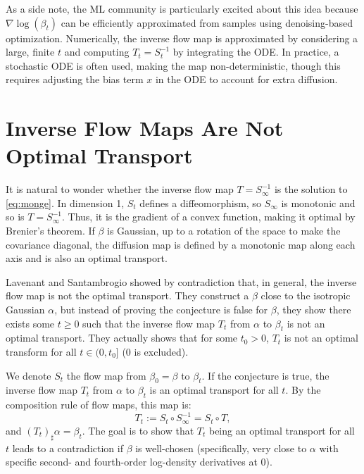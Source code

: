 \documentclass{article}
\begin{document}
As a side note, the ML community is particularly excited about this idea because $\nabla \log(\beta_t)$ can be efficiently approximated from samples using denoising-based optimization. Numerically, the inverse flow map is approximated by considering a large, finite $t$ and computing $T_t = S_t^{-1}$ by integrating the ODE. In practice, a stochastic ODE is often used, making the map non-deterministic, though this requires adjusting the bias term $x$ in the ODE to account for extra diffusion.

\section{Inverse Flow Maps Are Not Optimal Transport}

It is natural to wonder whether the inverse flow map $T=S_\infty^{-1}$ is the solution to \eqref{eq:monge}. In dimension 1, $S_t$ defines a diffeomorphism, so $S_\infty$ is monotonic and so is $T=S_\infty^{-1}$. Thus, it is the gradient of a convex function, making it optimal by Brenier's theorem. If $\beta$ is Gaussian, up to a rotation of the space to make the covariance diagonal, the diffusion map is defined by a monotonic map along each axis and is also an optimal transport.

Lavenant and Santambrogio showed  by contradiction that, in general, the inverse flow map is not the optimal transport. They construct a $\beta$ close to the isotropic Gaussian $\alpha$, but instead of proving the conjecture is false for $\beta$, they show there exists some $t \geq 0$ such that the inverse flow map $T_t$ from $\alpha$ to $\beta_t$ is not an optimal transport. They actually shows that for some $t_0>0$, $T_t$ is not an optimal transform for all $t \in (0,t_0]$ (0 is excluded). 

We denote $S_t$ the flow map from $\beta_0 = \beta$ to $\beta_t$. If the conjecture is true, the inverse flow map $T_t$ from $\alpha$ to $\beta_t$ is an optimal transport for all $t$. By the composition rule of flow maps, this map is:
\begin{equation}
    T_t := S_t \circ S_\infty^{-1} = S_t \circ T,
\end{equation}
and $(T_t)_\sharp \alpha = \beta_t$. The goal is to show that $T_t$ being an optimal transport for all $t$ leads to a contradiction if $\beta$ is well-chosen (specifically, very close to $\alpha$ with specific second- and fourth-order log-density derivatives at 0).
\end{document}
